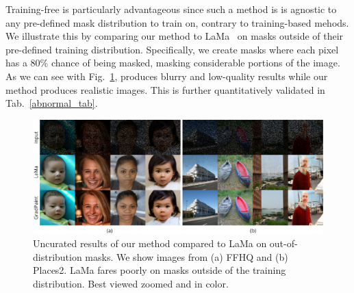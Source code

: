Training-free is particularly advantageous since such a method is is agnostic to any 
pre-defined mask distribution to train on, contrary to training-based mehods. We 
illustrate this by comparing our method to LaMa~\citep{lama} on masks outside of 
their pre-defined training distribution. Specifically, we create masks where each 
pixel has a 80\% chance of being masked, masking considerable portions of the image. 
As we can see with Fig.~\ref{fig:ood}, \cite{lama} produces blurry and low-quality
 results while our method produces realistic images. This is further quantitatively 
 validated in Tab.~\ref{abnormal_tab}. 

\begin{figure}[htbp]
  \centering
    \includegraphics[width=\linewidth]{images/gradpaint/abnormal_masks.pdf}
    \caption{Uncurated results of our method compared to LaMa on out-of-distribution masks. We show images from (a) FFHQ and (b) Places2. LaMa fares poorly on masks outside of the training distribution. Best viewed zoomed and in color.}
    \label{fig:ood}
\end{figure}





